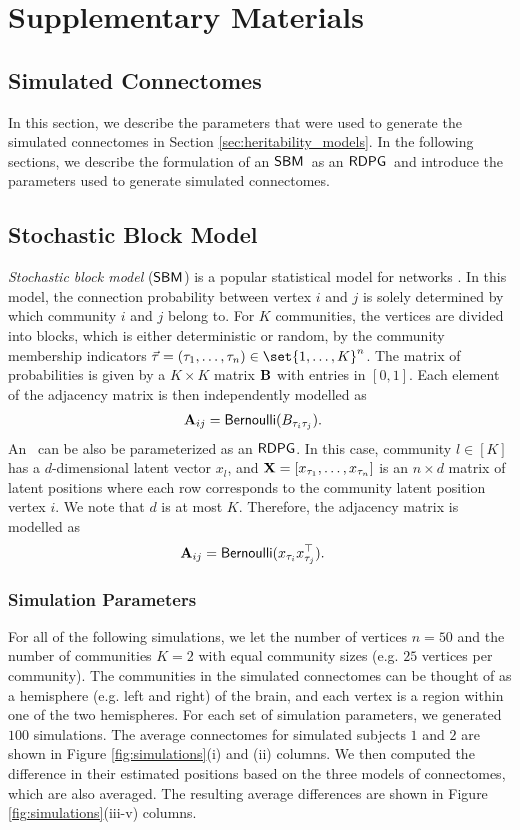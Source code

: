 \section{Supplementary Materials}
\subsection{Simulated Connectomes}\label{sup:simulations}
In this section, we describe the parameters that were used to generate the simulated connectomes in Section \ref{sec:heritability_models}. In the following sections, we describe the formulation of an $\operatorname{\mathsf{SBM}}$~as an $\operatorname{\mathsf{RDPG}}$~and introduce the parameters used to generate simulated connectomes. 

\subsection{Stochastic Block Model} \label{sec:sbm}
\textit{Stochastic block model }($\operatorname{\mathsf{SBM}}$) is a popular statistical model for networks \cite{holland1983stochastic}. In this model, the connection probability between vertex $i$ and $j$ is solely determined by which community $i$ and $j$ belong to. For $K$ communities, the vertices are divided into blocks, which is either deterministic or random, by the community membership indicators $\vec\tau = (\tau_1, \ldots, \tau_n)\in \set{1, \ldots, K}^n$. The matrix of probabilities is given by a $K\times K$ matrix $\operatorname*{\mathbf{B}}$ with entries in $[0, 1]$. Each element of the adjacency matrix is then independently modelled as
\begin{align*}
    \operatorname{\mathbf{A}}_{ij} &= \operatorname{\mathsf{Bernoulli}}(B_{\tau_i\tau_j}).
\end{align*}
An \sbm\ can be also be parameterized as an $\operatorname{\mathsf{RDPG}}$. In this case, community $l\in [K]$ has a $d$-dimensional latent vector $x_l$, and $\operatorname{\mathbf{X}}=[x_{\tau_1}, \ldots, x_{\tau_n}]$ is an $n \times d$ matrix of latent positions where each row corresponds to the community latent position vertex $i$. We note that $d$ is at most $K$. Therefore, the adjacency matrix is modelled as
\begin{align*}
    \operatorname{\mathbf{A}}_{ij} &= \operatorname{\mathsf{Bernoulli}}(x_{\tau_i} x_{\tau_j}^\top).
\end{align*}

\subsubsection{Simulation Parameters}
For all of the following simulations, we let the number of vertices $n=50$ and the number of communities $K=2$ with equal community sizes (e.g. $25$ vertices per community). The communities in the simulated connectomes can be thought of as a hemisphere (e.g. left and right) of the brain, and each vertex is a region within one of the two hemispheres. For each set of simulation parameters, we generated $100$ simulations. The average connectomes for simulated subjects $1$ and $2$ are shown in Figure \ref{fig:simulations}(i) and (ii) columns. We then computed the difference in their estimated positions based on the three models of connectomes, which are also averaged. The resulting average differences are shown in Figure \ref{fig:simulations}(iii-v) columns.  

